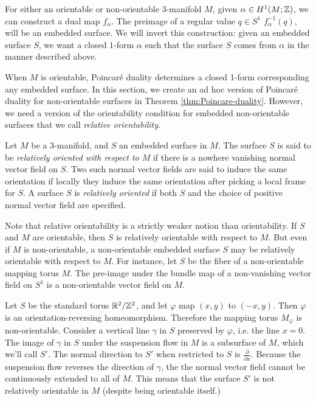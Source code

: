For either an orientable or non-orientable 3-manifold $M$, given $\alpha\in H^1(M; \mathbb{Z})$, we can construct a dual map $f_\alpha$.  The preimage of a regular value $q\in S^1$ $f_{\alpha}^{-1}(q)$, will be an embedded surface. %
We will invert this construction: given an embedded surface $S$, we want a
closed $1$-form $\alpha$ such that the surface $S$ comes from $\alpha$ in the manner described
above.

When $M$ is orientable, Poincar\'e duality determines a closed 1-form corresponding any embedded surface.  In this section, we create an ad hoc version of Poincar\'e duality for non-orientable surfaces in Theorem \ref{thm:Poincare-duality}.
However, we need a version of the orientability condition for embedded non-orientable surfaces that we call \emph{relative orientability}.

  Let $M$ be a $3$-manifold, and $S$ an embedded surface in $M$. The surface $S$ is said to be {\it relatively
  oriented with respect to $M$} if there is a nowhere vanishing normal vector field on $S$. Two
  such normal vector fields are said to induce the same orientation if locally they induce the
  same orientation after picking a local frame for $S$. A surface $S$ is \emph{relatively oriented}
  if both $S$ and the choice of positive normal vector field are specified.

Note that relative orientability is a strictly weaker notion than orientability. If $S$ and $M$ are
orientable, then $S$ is relatively orientable with respect to $M$. But even if $M$ is
non-orientable, a non-orientable embedded surface $S$ may be relatively orientable with respect to $M$. For instance, let $S$ be
the fiber of a non-orientable mapping torus $M$.  The pre-image under the bundle map of a non-vanishing vector field on $S^1$ is a non-orientable vector field on $M$.

  Let $S$ be the standard torus $\mathbb{R}^2/\mathbb{Z}^2$, and let $\varphi$ map $(x,y)$ to $(-x, y)$. Then $\varphi$ is an
  orientation-reversing homeomorphism.  Therefore the mapping torus $M_\varphi$ is non-orientable. Consider a vertical line $\gamma$ in $S$ preserved by $\varphi$, i.e. the line
  $x = 0$. The image of $\gamma$ in $S$ under the suspension flow in $M$ is a subsurface of $M$,
  which we'll call $S'$. The normal direction to $S'$ when restricted to $S$ is $\frac{\partial}{\partial x}$. Because the suspension flow reverses the direction of $\gamma$, the 
  the normal vector field cannot be continuously extended to all of $M$.
  This means that the surface $S'$ is not relatively orientable in $M$ (despite being orientable itself.)

